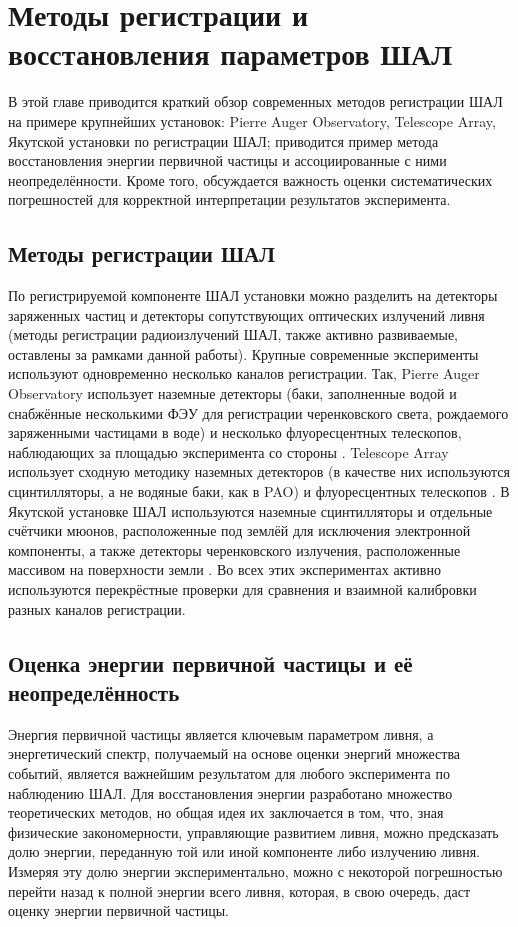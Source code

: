 \chapter{Методы регистрации и восстановления параметров ШАЛ}

\label{chapt:review}

В этой главе приводится краткий обзор современных методов регистрации ШАЛ на примере крупнейших установок: Pierre Auger Observatory, Telescope Array, Якутской установки по регистрации ШАЛ; приводится пример метода восстановления энергии первичной частицы и ассоциированные с ними неопределённости. Кроме того, обсуждается важность оценки систематических погрешностей для корректной интерпретации результатов эксперимента.


\section{Методы регистрации ШАЛ}

По регистрируемой компоненте ШАЛ установки можно разделить на детекторы заряженных частиц и детекторы сопутствующих оптических излучений ливня (методы регистрации радиоизлучений ШАЛ, также активно развиваемые, оставлены за рамками данной работы). Крупные современные эксперименты используют одновременно несколько каналов регистрации. Так, Pierre Auger Observatory использует наземные детекторы (баки, заполненные водой и снабжённые несколькими ФЭУ для регистрации черенковского света, рождаемого заряженными частицами в воде) и несколько флуоресцентных телескопов, наблюдающих за площадью эксперимента со стороны \cite{Abraham2010}. Telescope Array использует сходную методику наземных детекторов (в качестве них используются сцинтилляторы, а не водяные баки, как в PAO) и флуоресцентных телескопов \cite{AbuZayyad2013}. В Якутской установке ШАЛ используются наземные сцинтилляторы и отдельные счётчики мюонов, расположенные под землёй для исключения электронной компоненты, а также детекторы черенковского излучения, расположенные массивом на поверхности земли \cite{Ivanov2007}. Во всех этих экспериментах активно используются перекрёстные проверки для сравнения и взаимной калибровки разных каналов регистрации.


\section{Оценка энергии первичной частицы и её неопределённость}

Энергия первичной частицы является ключевым параметром ливня, а энергетический спектр, получаемый на основе оценки энергий множества событий, является важнейшим результатом для любого эксперимента по наблюдению ШАЛ. Для восстановления энергии разработано множество теоретических методов, но общая идея их заключается в том, что, зная физические закономерности, управляющие развитием ливня, можно предсказать долю энергии, переданную той или иной компоненте либо излучению ливня. Измеряя эту долю энергии экспериментально, можно с некоторой погрешностью перейти назад к полной энергии всего ливня, которая, в свою очередь, даст оценку энергии первичной частицы.

